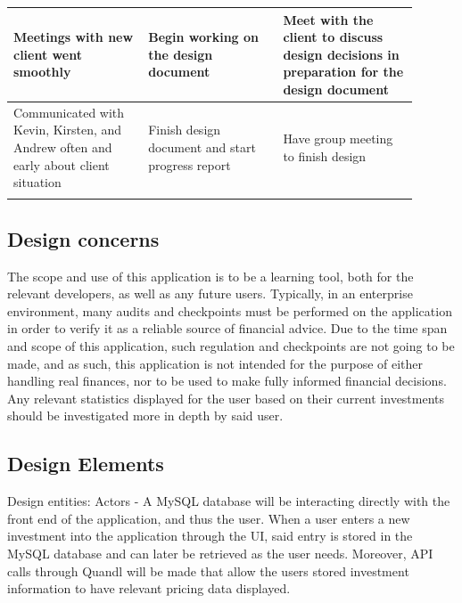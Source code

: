 \documentclass[onecolumn, draftclsnofoot,10pt, compsoc]{IEEEtran}
\begin{document}
\begin{table}
\begin{tabular}{| p{0.3\linewidth} | p{0.3\linewidth} | p{0.3\linewidth} | }
                                        Meetings with new client went smoothly & Begin working on the design document & Meet with the client to discuss design decisions in preparation for the design document  \\
                                        \hline
                                        Communicated with Kevin, Kirsten, and Andrew often and early about client situation & Finish design document and start progress report & Have group meeting to finish design \\
                                        \hline
                                        & & \\
                                        \hline
                                        \hline
                                        \hline

                                \end{tabular}
\end{table}

\subsection{Design concerns}
        The scope and use of this application is to be a learning tool, both for the relevant developers, as well as any future users. Typically, in an enterprise environment, many audits and
        checkpoints must be performed on the application in order to verify it as a reliable source of financial advice. Due to the time span and scope of this application, such regulation and
        checkpoints are not going to be made, and as such, this application is not intended for the purpose of either handling real finances, nor to be used to make fully informed financial decisions.
        Any relevant statistics displayed for the user based on their current investments should be investigated more in depth by said user.

\subsection{Design Elements}
        Design entities: Actors - A MySQL database will be interacting directly with the front end of the application, and thus the user. When a user enters a new investment into the application
        through the UI, said entry is stored in the MySQL database and can later be retrieved as the user needs. Moreover, API calls through Quandl will be made that allow the users stored investment
        information to have relevant pricing data displayed.
\end{document}
